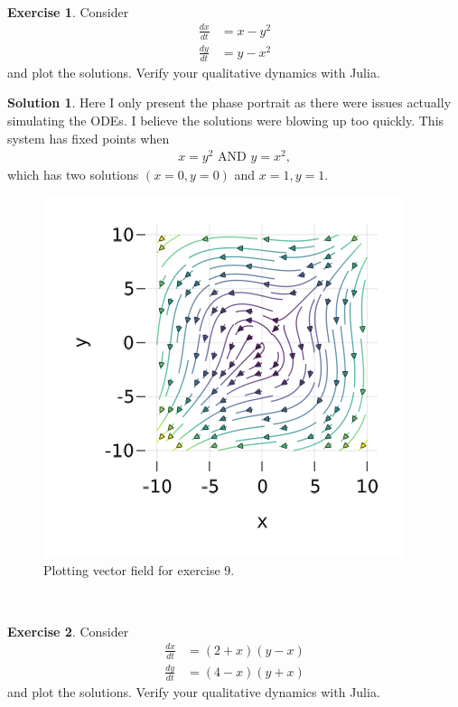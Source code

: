 \documentclass[12pt]{article}
\theoremstyle{definition}
\newtheorem{exer}{Exercise}
\newtheorem{sol}{Solution}
\theoremstyle{remark}
\begin{document}
\newpage

\

\newpage

\begin{exer}
Consider 
\begin{align*}
    \frac{dx}{dt} &= x - y^2\\
    \frac{dy}{dt} &= y - x^2
\end{align*}
and plot the solutions. Verify your qualitative dynamics with Julia.
\end{exer}

\begin{sol}\leavevmode
    Here I only present the phase portrait as there were issues actually simulating the ODEs. I believe the solutions were blowing up too quickly. This system has fixed points when
    \begin{align*}
        x = y^{2} \text{ AND } y = x^2,
    \end{align*}
    which has two solutions $(x = 0, y = 0)$ and $x = 1, y = 1$. 
 \end{sol}

   \begin{figure}[h]
     \centering
     \includegraphics[width=0.8\linewidth]{figs/hw-1-exer-9.png}
     \caption{Plotting vector field for exercise 9.}%
     \label{fig:exer-9}
 \end{figure}

\newpage

\

\newpage

\begin{exer}
Consider 
\begin{align*}
    \frac{dx}{dt} &= (2 + x)(y - x)\\
    \frac{dy}{dt} &= (4 - x) ( y + x )
\end{align*}
and plot the solutions. Verify your qualitative dynamics with Julia.
\end{exer}
\end{document}

